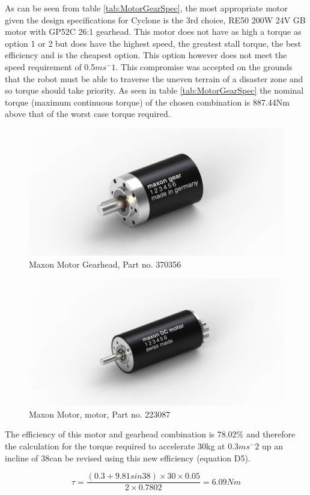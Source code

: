 As can be seen from table \ref{tab:MotorGearSpec}, the most appropriate motor given the design specifications for Cyclone is the 3rd choice, RE50 200W 24V GB motor with GP52C 26:1 gearhead. This motor does not have as high a torque as option 1 or 2 but does have the highest speed, the greatest stall torque, the best efficiency and is the cheapest option. This option however does not meet the speed requirement of 0.5$ms^-1$. This compromise was accepted on the grounds that the robot must be able to traverse the uneven terrain of a disaster zone and so torque should take priority. As seen in table \ref{tab:MotorGearSpec} the nominal torque (maximum continuous torque) of the chosen combination is 887.44Nm above that of the worst case torque required.\par

\begin{figure}[h]
\centering\includegraphics[width=0.6\linewidth]{Images/DT_Fig_17.jpg}
\caption{Maxon Motor Gearhead, Part no. 370356}
\label{fig:gear}
\end{figure}
\begin{figure}[h]
\centering\includegraphics[width=0.6\linewidth]{Images/DT_Fig_18.jpg}
\caption{Maxon Motor, motor, Part no. 223087}
\label{fig:motor}
\end{figure}

The efficiency of this motor and gearhead combination is 78.02\% and therefore the calculation for the torque required to accelerate 30kg at 0.3$ms^-2$ up an incline of 38\textordmasculine can be revised using this new efficiency (equation D5).\par
\begin{equation}
\tau= \frac{(0.3+9.81sin38) \times 30 \times 0.05}{2 \times 0.7802} =6.09 Nm
\end{equation}

